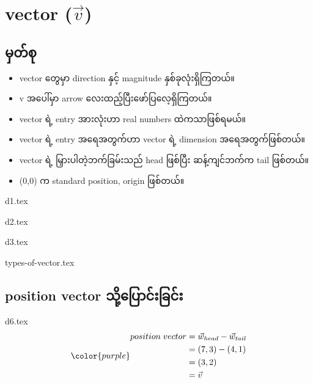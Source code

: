 \section{vector ($\vec{v}$)}
\subsection{မှတ်စု}
{\begin{itemize}
        \item vector တွေမှာ direction နှင့် magnitude နှစ်ခုလုံးရှိကြတယ်။
        \item v အပေါ်မှာ arrow လေးထည့်ပြီးဖော်ပြလေ့ရှိကြတယ်။
        \item vector ရဲ့ entry အားလုံးဟာ real numbers ထဲကသာဖြစ်ရမယ်။
        \item vector ရဲ့ entry အရေအတွက်ဟာ vector ရဲ့ dimension အရေအတွက်ဖြစ်တယ်။
        \item vector ရဲ့ မြှားပါတဲ့ဘက်ခြမ်းသည် head ဖြစ်ပြီး ဆန့်ကျင်ဘက်က tail ဖြစ်တယ်။
        \item (0,0) က standard position, origin ဖြစ်တယ်။
    \end{itemize}}
\begin{minipage}{0.45\textwidth}
    \centering
    {d1.tex}
\end{minipage}
\hfill
\begin{minipage}{0.45\textwidth}
    \centering
    {d2.tex}
\end{minipage}
\clearpage
\begin{center}
    {d3.tex}
\end{center}
{types-of-vector.tex}
\subsection{position vector သို့ပြောင်းခြင်း}
{d6.tex}
\begin{equation}
    {\color{purple} \begin{split}
        position\hspace{1mm}vector & = \vec{w}_{head} - \vec{w}_{tail} \\
                        & = (7,3) - (4,1) \\
                        & = (3,2) \\
                        & = \vec{v}
    \end{split}}
\end{equation}